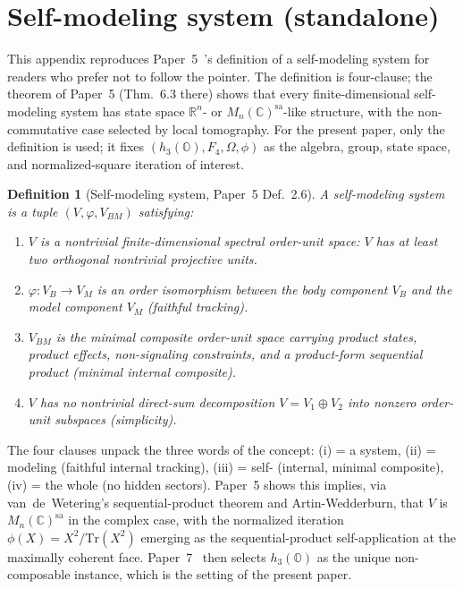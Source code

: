 \documentclass[12pt]{article}
\newtheorem{definition}[theorem]{Definition}
\theoremstyle{remark}
\newcommand{\hthree}{h_3(\mathbb{O})}
\newcommand{\Ffour}{F_4}
\newcommand{\Tr}{\mathrm{Tr}}
\begin{document}
\appendix

\section{Self-modeling system (standalone)}
\label{app:self-modeling}

This appendix reproduces Paper~5~\cite{ehrlich2026qm}'s definition
of a self-modeling system for readers who prefer not to follow the
pointer. The definition is four-clause; the theorem of Paper~5
(Thm.~6.3 there) shows that every finite-dimensional self-modeling
system has state space $\mathbb{R}^n$- or $M_n(\mathbb{C})^{\mathrm{sa}}$-like
structure, with the non-commutative case selected by local
tomography. For the present paper, only the definition is used; it
fixes $(\hthree, \Ffour, \Omega, \phi)$ as the algebra, group,
state space, and normalized-square iteration of interest.

\begin{definition}[Self-modeling system, Paper~5 Def.~2.6]
\label{app-def:sms}
A \emph{self-modeling system} is a tuple $(V, \varphi, V_{BM})$
satisfying:
\begin{enumerate}[label=(\roman*)]
  \item $V$ is a nontrivial finite-dimensional spectral order-unit
    space: $V$ has at least two orthogonal nontrivial projective
    units.
  \item $\varphi: V_B \to V_M$ is an order isomorphism between the
    body component $V_B$ and the model component $V_M$
    (\emph{faithful tracking}).
  \item $V_{BM}$ is the minimal composite order-unit space carrying
    product states, product effects, non-signaling constraints, and
    a product-form sequential product (\emph{minimal internal
    composite}).
  \item $V$ has no nontrivial direct-sum decomposition
    $V = V_1 \oplus V_2$ into nonzero order-unit subspaces
    (\emph{simplicity}).
\end{enumerate}
\end{definition}

The four clauses unpack the three words of the concept: (i) = a
system, (ii) = modeling (faithful internal tracking), (iii) = self-
(internal, minimal composite), (iv) = the whole (no hidden
sectors). Paper~5 shows this implies, via van~de~Wetering's
sequential-product theorem and Artin-Wedderburn, that $V$ is
$M_n(\mathbb{C})^{\mathrm{sa}}$ in the complex case, with the
normalized iteration $\phi(X) = X^2 / \Tr(X^2)$ emerging as the
sequential-product self-application at the maximally coherent
face. Paper~7~\cite{ehrlich2026h3o} then selects $\hthree$ as the
unique non-composable instance, which is the setting of the
present paper.
\end{document}
